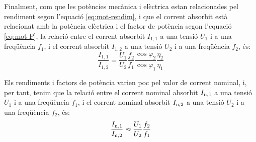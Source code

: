 Finalment, com que les potències mecànica i elèctrica estan relacionades pel rendiment segon l'equació \eqref{eq:mot-rendim}, i que el corrent absorbit està relacionat amb la potència elèctrica i el factor de potència segon l'equació \eqref{eq:mot-P}, la relació entre el corrent absorbit $I_{1,1}$  a una tensió $U_1$ i a una freqüència $f_1$, i el corrent absorbit $I_{1,2}$ a una tensió $U_2$ i a una freqüència $f_2$, és:
\begin{equation}
	\frac{I_{1,1}}{I_{1,2}} =
	\frac{U_1}{U_2} \frac{f_2}{f_1} \frac{\cos\varphi_2}{\cos\varphi_1} \frac{\eta_2}{\eta_1}
\end{equation}

Els rendiments i factors de potència varien poc pel valor de corrent nominal, i, per tant, tenim que la relació entre el corrent nominal absorbit $I_\mathrm{n,1}$  a una tensió $U_1$ i a una freqüència $f_1$, i el corrent nominal absorbit $I_\mathrm{n,2}$ a una tensió $U_2$ i a una freqüència $f_2$, és:
\begin{equation}\label{eq:In_U_f}
	\frac{I_\mathrm{n,1}}{I_\mathrm{n,2}} \approx
	\frac{U_1}{U_2} \frac{f_2}{f_1}
\end{equation}


